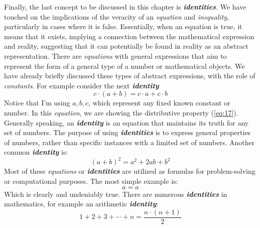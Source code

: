 Finally, the last concept to be discussed in this chapter is \textit{\textbf{identities}}. We have touched on the implications of the veracity of an \textit{equation} and \textit{inequality}, particularly in cases where it is false. Essentially, when an equation is true, it means that it exists, implying a connection between the mathematical expression and reality, suggesting that it can potentially be found in reality as an abstract representation. There are \textit{equations} with general expressions that aim to represent the form of a general type of a number or mathematical objects. We have already briefly discussed these types of abstract expressions, with the role of \textit{constants}. For example consider the next \textit{\textbf{identity}}
\begin{equation} \label{eq:17}
  c \cdot (a + b) = c \cdot a + c \cdot b
\end{equation}
Notice that I'm using $a, b, c$, which represent any fixed known constant or number. In this \textit{equation}, we are showing the distributive property (\ref{eq:17}). Generally speaking, an \textit{\textbf{identity}} is an equation that maintains its truth for any set of numbers. The purpose of using \textit{\textbf{identities}} is to express general properties of numbers, rather than specific instances with a limited set of numbers. Another common \textit{\textbf{identity}} is:
\begin{equation} \label{eq:18}
  (a + b)^2 = a^2 + 2ab + b^2
\end{equation}
Most of these \textit{equations} or \textit{\textbf{identities}} are utilized as formulas for problem-solving or computational purposes. The most simple example is:
\[
  a = a
\]
Which is clearly and undeniably true. There are numerous \textit{\textbf{identities}} in mathematics, for example an arithmetic \textit{\textbf{identity}}:
\begin{equation} \label{eq:19}
  1 + 2 + 3 + \cdots + n = \frac{n \cdot (n + 1)}{2}
\end{equation}

